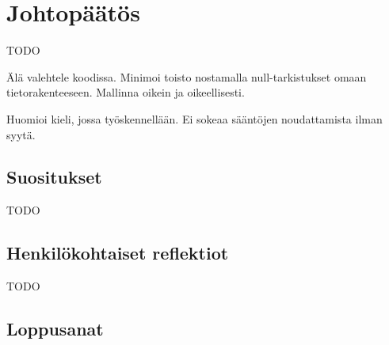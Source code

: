 \vspace{21.5pt}
\chapter{Johtopäätös}
TODO

Älä valehtele koodissa. Minimoi toisto nostamalla null-tarkistukset omaan tietorakenteeseen.
Mallinna oikein ja oikeellisesti.

Huomioi kieli, jossa työskennellään. Ei sokeaa sääntöjen noudattamista ilman syytä.

\section{Suositukset}

TODO

\section{Henkilökohtaiset reflektiot}

TODO



\section{Loppusanat}